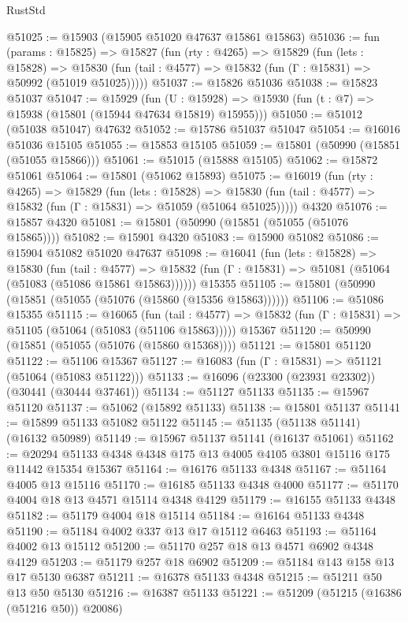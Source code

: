 \begin{lexlean}{RustStd}
\begin{coremodule}
@51025 := @15903 (@15905 @51020 @47637 @15861 @15863)
@51036 := fun (params : @15825) =>
  @15827
    (fun (rty : @4265) =>
    @15829
      (fun (lets : @15828) =>
      @15830 (fun (tail : @4577) => @15832 (fun (Γ : @15831) => @50992 (@51019 @51025)))))
@51037 := @15826 @51036
@51038 := @15823 @51037
@51047 := @15929
    (fun (U : @15928) => @15930 (fun (t : @7) => @15938 (@15801 (@15944 @47634 @15819) @15955)))
@51050 := @51012 (@51038 @51047) @47632
@51052 := @15786 @51037 @51047
@51054 := @16016 @51036 @15105
@51055 := @15853 @15105
@51059 := @15801 (@50990 (@15851 (@51055 @15866)))
@51061 := @51015 (@15888 @15105)
@51062 := @15872 @51061
@51064 := @15801 (@51062 @15893)
@51075 := @16019
    (fun (rty : @4265) =>
    @15829
      (fun (lets : @15828) =>
      @15830 (fun (tail : @4577) => @15832 (fun (Γ : @15831) => @51059 (@51064 @51025)))))
    @4320
@51076 := @15857 @4320
@51081 := @15801 (@50990 (@15851 (@51055 (@51076 @15865))))
@51082 := @15901 @4320
@51083 := @15900 @51082
@51086 := @15904 @51082 @51020 @47637
@51098 := @16041
    (fun (lets : @15828) =>
    @15830
      (fun (tail : @4577) =>
      @15832 (fun (Γ : @15831) => @51081 (@51064 (@51083 (@51086 @15861 @15863))))))
    @15355
@51105 := @15801 (@50990 (@15851 (@51055 (@51076 (@15860 (@15356 @15863))))))
@51106 := @51086 @15355
@51115 := @16065
    (fun (tail : @4577) => @15832 (fun (Γ : @15831) => @51105 (@51064 (@51083 (@51106 @15863)))))
    @15367
@51120 := @50990 (@15851 (@51055 (@51076 (@15860 @15368))))
@51121 := @15801 @51120
@51122 := @51106 @15367
@51127 := @16083 (fun (Γ : @15831) => @51121 (@51064 (@51083 @51122)))
@51133 := @16096 (@23300 (@23931 @23302)) (@30441 (@30444 @37461))
@51134 := @51127 @51133
@51135 := @15967 @51120
@51137 := @51062 (@15892 @51133)
@51138 := @15801 @51137
@51141 := @15899 @51133 @51082 @51122
@51145 := @51135 (@51138 @51141) (@16132 @50989)
@51149 := @15967 @51137 @51141 (@16137 @51061)
@51162 := @20294 @51133 @4348 @4348 @175 @13 @4005 @4105 @3801 @15116 @175 @11442 @15354 @15367
@51164 := @16176 @51133 @4348
@51167 := @51164 @4005 @13 @15116
@51170 := @16185 @51133 @4348 @4000
@51177 := @51170 @4004 @18 @13 @4571 @15114 @4348 @4129
@51179 := @16155 @51133 @4348
@51182 := @51179 @4004 @18 @15114
@51184 := @16164 @51133 @4348
@51190 := @51184 @4002 @337 @13 @17 @15112 @6463
@51193 := @51164 @4002 @13 @15112
@51200 := @51170 @257 @18 @13 @4571 @6902 @4348 @4129
@51203 := @51179 @257 @18 @6902
@51209 := @51184 @143 @158 @13 @17 @5130 @6387
@51211 := @16378 @51133 @4348
@51215 := @51211 @50 @13 @50 @5130
@51216 := @16387 @51133
@51221 := @51209 (@51215 (@16386 (@51216 @50)) @20086)

\end{coremodule}
\end{lexlean}
